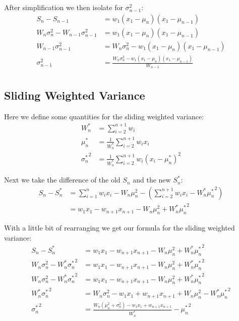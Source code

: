 \documentclass[english,12pt]{article}
\theoremstyle{plain}
\theoremstyle{definition}
\theoremstyle{definition} %
\newcommand{\brac}[1]{\left(#1\right)} %
\begin{document}
After simplification we then isolate for $\sigma_{n-1}^2$:
\begin{align*}
S_{n} - S_{n-1} &= w_1(x_1 - \mu_n)(x_1 - \mu_{n-1})\\
W_{n}\sigma_{n}^2 - W_{n-1}\sigma_{n-1}^2 &= w_1(x_1 - \mu_n)(x_1 - \mu_{n-1})\\
W_{n-1}\sigma_{n-1}^2 &= W_{n}\sigma_{n}^2 - w_1(x_1 - \mu_n)(x_1 - \mu_{n-1})\\
\sigma_{n-1}^2 &= \frac{W_{n}\sigma_{n}^2 - w_1(x_1 - \mu_n)(x_1 - \mu_{n-1})}{W_{n-1}}\\
\end{align*}

\subsection{Sliding Weighted Variance}
Here we define some quantities for the sliding weighted variance:
\begin{align*}
W_n^\ast &= \sum_{i=2}^{n+1}w_i\\
\mu_n^\ast &=\frac{1}{W_n^\ast}\sum_{i=2}^{n+1}w_ix_i\\
{\sigma_n^\ast}^2 &= \frac{1}{W_n^\ast}\sum_{i=2}^{n+1}w_i(x_i - \mu_n^\ast)^2
\end{align*}

Next we take the difference of the old $S_n$ and the new $S_n^\ast$:
\begin{align*}
S_n - S_n^\ast &= \sum_{i=1}^n w_ix_i - W_n\mu_n^2 - \brac{\sum_{i=2}^{n+1}w_ix_i - W_n^\ast{\mu_n^\ast}^2}\\
&= w_1x_1 - w_{n+1}x_{n+1} - W_n\mu_n^2 + W_n^\ast{\mu_n^\ast}^2
\end{align*}

With a little bit of rearranging we get our formula for the sliding weighted variance:
\begin{align*}
S_n - S_n^\ast &= w_1x_1 - w_{n+1}x_{n+1} - W_n\mu_n^2 + W_n^\ast{\mu_n^\ast}^2\\
W_n\sigma_n^2 - W_n^\ast{\sigma_n^\ast}^2 &= w_1x_1 - w_{n+1}x_{n+1} - W_n\mu_n^2 + W_n^\ast{\mu_n^\ast}^2\\
W_n\sigma_n^2 - W_n^\ast{\sigma_n^\ast}^2 &= w_1x_1 - w_{n+1}x_{n+1} - W_n\mu_n^2 + W_n^\ast{\mu_n^\ast}^2\\
W_n^\ast{\sigma_n^\ast}^2 &= W_n\sigma_n^2 - w_1x_1 + w_{n+1}x_{n+1} + W_n\mu_n^2 - W_n^\ast{\mu_n^\ast}^2\\
{\sigma_n^\ast}^2 &= \frac{W_n(\mu_n^2 + \sigma_n^2) - w_1x_1 + w_{n+1}x_{n+1}}{W_n^\ast} - {\mu_n^\ast}^2\\
\end{align*}
\end{document}
